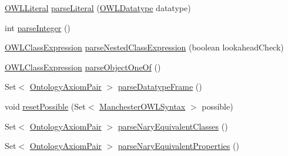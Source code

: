 \begin{DoxyCompactItemize}
\item 
\hyperlink{interfaceorg_1_1semanticweb_1_1owlapi_1_1model_1_1_o_w_l_literal}{O\-W\-L\-Literal} \hyperlink{classorg_1_1coode_1_1owlapi_1_1manchesterowlsyntax_1_1_manchester_o_w_l_syntax_editor_parser_aa5ada3dfed96e8022fcd7c6c9f4bbd39}{parse\-Literal} (\hyperlink{interfaceorg_1_1semanticweb_1_1owlapi_1_1model_1_1_o_w_l_datatype}{O\-W\-L\-Datatype} datatype)
\item 
int \hyperlink{classorg_1_1coode_1_1owlapi_1_1manchesterowlsyntax_1_1_manchester_o_w_l_syntax_editor_parser_afe5804591e82cb743ee66ffc7d1233b1}{parse\-Integer} ()
\item 
\hyperlink{interfaceorg_1_1semanticweb_1_1owlapi_1_1model_1_1_o_w_l_class_expression}{O\-W\-L\-Class\-Expression} \hyperlink{classorg_1_1coode_1_1owlapi_1_1manchesterowlsyntax_1_1_manchester_o_w_l_syntax_editor_parser_aad2a7b4fb7a8f4b6fb82ded31c88abb5}{parse\-Nested\-Class\-Expression} (boolean lookahead\-Check)
\item 
\hyperlink{interfaceorg_1_1semanticweb_1_1owlapi_1_1model_1_1_o_w_l_class_expression}{O\-W\-L\-Class\-Expression} \hyperlink{classorg_1_1coode_1_1owlapi_1_1manchesterowlsyntax_1_1_manchester_o_w_l_syntax_editor_parser_a5654d9ba908cf60c775bf0213e681350}{parse\-Object\-One\-Of} ()
\item 
Set$<$ \hyperlink{classorg_1_1coode_1_1owlapi_1_1manchesterowlsyntax_1_1_ontology_axiom_pair}{Ontology\-Axiom\-Pair} $>$ \hyperlink{classorg_1_1coode_1_1owlapi_1_1manchesterowlsyntax_1_1_manchester_o_w_l_syntax_editor_parser_abaad33036811b21f438142f93f29c198}{parse\-Datatype\-Frame} ()
\item 
void \hyperlink{classorg_1_1coode_1_1owlapi_1_1manchesterowlsyntax_1_1_manchester_o_w_l_syntax_editor_parser_a672160f8c9a868b8295dac8b3e1bd7af}{reset\-Possible} (Set$<$ \hyperlink{enumorg_1_1coode_1_1owlapi_1_1manchesterowlsyntax_1_1_manchester_o_w_l_syntax}{Manchester\-O\-W\-L\-Syntax} $>$ possible)
\item 
Set$<$ \hyperlink{classorg_1_1coode_1_1owlapi_1_1manchesterowlsyntax_1_1_ontology_axiom_pair}{Ontology\-Axiom\-Pair} $>$ \hyperlink{classorg_1_1coode_1_1owlapi_1_1manchesterowlsyntax_1_1_manchester_o_w_l_syntax_editor_parser_aa50187a40ea4bb23a89e297a0b4ee7b2}{parse\-Nary\-Equivalent\-Classes} ()
\item 
Set$<$ \hyperlink{classorg_1_1coode_1_1owlapi_1_1manchesterowlsyntax_1_1_ontology_axiom_pair}{Ontology\-Axiom\-Pair} $>$ \hyperlink{classorg_1_1coode_1_1owlapi_1_1manchesterowlsyntax_1_1_manchester_o_w_l_syntax_editor_parser_a51a5ad3b9453f21ad4052fc73e184bdd}{parse\-Nary\-Equivalent\-Properties} ()

\end{DoxyCompactItemize}
